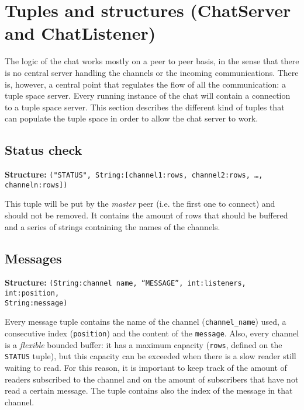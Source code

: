 \documentclass[paper=a4, fontsize=11pt]{scrartcl} %
\begin{document}
\section{Tuples and structures (ChatServer and ChatListener)}

The logic of the chat works mostly on a peer to peer basis, in the sense that there is no central server handling the channels or the incoming communications. There is, however, a central point that regulates the flow of all the communication: a tuple space server. Every running instance of the chat will contain a connection to a tuple space server. This section describes the different kind of tuples that can populate the tuple space in order to allow the chat server to work. 

\subsection{Status check}

\textbf{Structure:} \verb|("STATUS", String:[channel1:rows, channel2:rows, …, channeln:rows])|

This tuple will be put by the \emph{master} peer (i.e. the first one to connect) and should not be removed. It contains the amount of rows that should be buffered and a series of strings containing the names of the channels.

\subsection{Messages}

\textbf{Structure:} \texttt{(String:channel name, ``MESSAGE'', int:listeners, int:position,\\ String:message)}


Every message tuple contains the name of the channel (\verb|channel_name|) used, a consecutive index (\verb|position|) and the content of the \verb|message|. Also, every channel is a \emph{flexible} bounded buffer: it has a maximum capacity (\verb|rows|, defined on the \verb|STATUS| tuple), but this capacity can be exceeded when there is a slow reader still waiting to read. For this reason, it is important to keep track of the amount of readers subscribed to the channel and on the amount of subscribers that have not read a certain message. The tuple contains also the index of the message in that channel.
\end{document}
